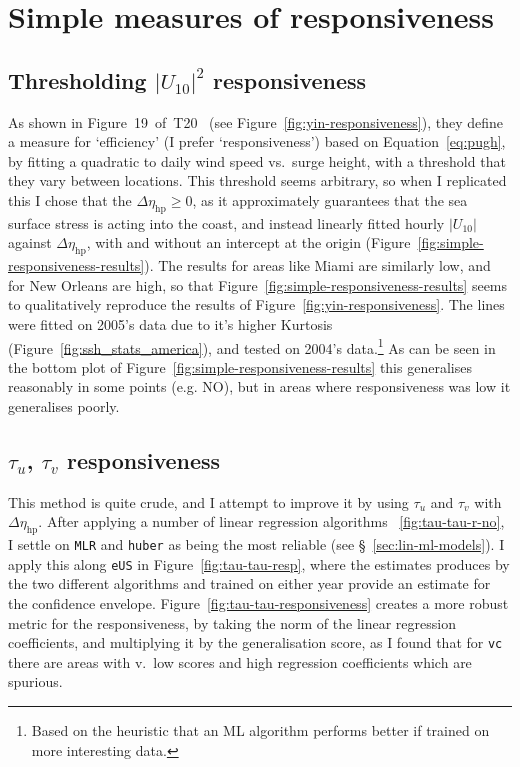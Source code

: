 \section{Simple measures of responsiveness}
\label{sec:responsiveness}

\subsection{Thresholding $|U_{10}|^2$ responsiveness}
\label{sec:thresh-resp}

As shown in Figure~19~of~T20~\cite{ZannaPreprint} (see Figure~\ref{fig:yin-responsiveness}),
they define a measure for `efficiency' (I prefer `responsiveness') based on Equation~\ref{eq:pugh},
by fitting a quadratic to daily wind speed vs.~surge height, with a threshold that they
vary between locations.
This threshold seems arbitrary,
so when I replicated this I chose that the $\Delta\eta_{\mathrm{hp}} \ge 0$,
as it approximately guarantees that the sea surface stress is acting into
the coast, and instead linearly fitted hourly $|U_{10}|$ against $\Delta\eta_{\mathrm{hp}}$,
with and without an intercept at the origin (Figure~\ref{fig:simple-responsiveness-results}).
The results for areas like Miami are similarly low, and for New Orleans are high,
so that Figure~\ref{fig:simple-responsiveness-results} seems to qualitatively reproduce the
results of Figure~\ref{fig:yin-responsiveness}. The lines were fitted on
2005's data due to it's higher Kurtosis (Figure~\ref{fig:ssh_stats_america}), and tested on
2004's data.\footnote{Based on the heuristic that
an ML algorithm performs better if trained on more interesting data.}
As can be seen in the bottom plot of Figure~\ref{fig:simple-responsiveness-results}
this generalises reasonably in some points (e.g. NO), but in areas where responsiveness was
low it generalises poorly.


\subsection{$\tau_u$, $\tau_v$ responsiveness}
\label{sec:tau-tau}
This method is quite crude, and I attempt to improve it by
using $\tau_u$ and $\tau_v$ with $\Delta\eta_{\mathrm{hp}}$.
After applying a number of linear regression algorithms ~\ref{fig:tau-tau-r-no},
I settle on \texttt{MLR} and \texttt{huber} as being the most reliable (see §~\ref{sec:lin-ml-models}).
I apply this along \texttt{eUS} in
Figure~\ref{fig:tau-tau-resp}, where the estimates produces by the
two different algorithms and trained on either year provide an estimate
for the confidence envelope.
Figure~\ref{fig:tau-tau-responsiveness}
creates a more robust metric for the responsiveness, by
taking the norm of the linear regression coefficients, and multiplying it
by the generalisation score, as I found that for \texttt{vc}
there are areas with v.~low scores and high regression coefficients which are spurious.

